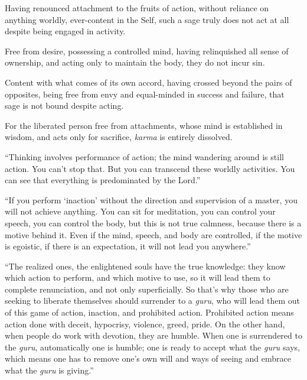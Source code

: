 {Having renounced attachment to the fruits of action, without reliance on anything worldly, ever-content in the Self, such a sage truly does not act at all despite being engaged in activity.}

{Free from desire, possessing a controlled mind, having relinquished all sense of ownership, and acting only to maintain the body, they do not incur sin.}

{Content with what comes of its own accord, having crossed beyond the pairs of opposites, being free from envy and equal-minded in success and failure, that sage is not bound despite acting.}

{For the liberated person free from attachments, whose mind is established in wisdom, and acts only for sacrifice, \textit{karma} is entirely dissolved.}

\enquote{Thinking involves performance of action; the mind wandering around is still action. You can’t stop that. But you can transcend these worldly activities. You can see that everything is predominated by the Lord.}

\enquote{If you perform \enquote{inaction} without the direction and supervision of a master, you will not achieve anything. You can sit for meditation, you can control your speech, you can control the body, but this is not true calmness, because there is a motive behind it. Even if the mind, speech, and body are controlled, if the motive is egoistic, if there is an expectation, it will not lead you anywhere.}

\enquote{The realized ones, the enlightened souls have the true knowledge: they know which action to perform, and which motive to use, so it will lead them to complete renunciation, and not only superficially. So that’s why those who are seeking to liberate themselves should surrender to a \textit{guru}, who will lead them out of this game of action, inaction, and prohibited action. Prohibited action means action done with deceit, hypocrisy, violence, greed, pride. On the other hand, when people do work with devotion, they are humble. When one is surrendered to the \textit{guru}, automatically one is humble; one is ready to accept what the \textit{guru} says, which means one has to remove one’s own will and ways of seeing and embrace what the \textit{guru} is giving.}

